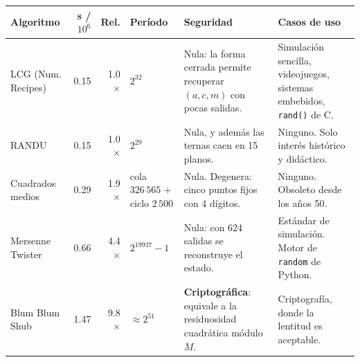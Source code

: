 \begin{tabular}{lrrlp{4cm}p{4cm}}
\toprule
Algoritmo & s / $10^6$ & Rel. & Período & Seguridad & Casos de uso \\
\midrule
LCG (Num. Recipes) & 0.15 & 1.0$\times$ & $2^{32}$ & Nula: la forma cerrada permite recuperar $(a,c,m)$ con pocas salidas. & Simulación sencilla, videojuegos, sistemas embebidos, \texttt{rand()} de C. \\
RANDU & 0.15 & 1.0$\times$ & $2^{29}$ & Nula, y además las ternas caen en 15 planos. & Ninguno. Solo interés histórico y didáctico. \\
Cuadrados medios & 0.29 & 1.9$\times$ & cola $326\,565$ + ciclo $2\,500$ & Nula. Degenera: cinco puntos fijos con 4 dígitos. & Ninguno. Obsoleto desde los años 50. \\
Mersenne Twister & 0.66 & 4.4$\times$ & $2^{19937}-1$ & Nula: con 624 salidas se reconstruye el estado. & Estándar de simulación. Motor de \texttt{random} de Python. \\
Blum Blum Shub & 1.47 & 9.8$\times$ & $\approx 2^{51}$ & \textbf{Criptográfica}: equivale a la residuosidad cuadrática módulo $M$. & Criptografía, donde la lentitud es aceptable. \\
\bottomrule
\end{tabular}
